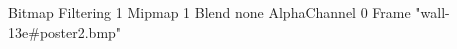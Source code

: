 {Bitmap
	{Filtering 1}
	{Mipmap 1}
	{Blend none}
	{AlphaChannel 0}
	{Frame "wall-13e#poster2.bmp"}
}
